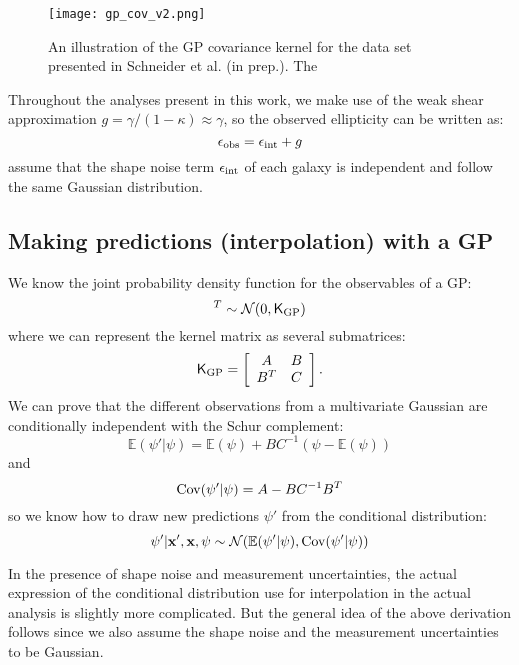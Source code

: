 \begin{figure}
	\centering
	\texttt{[image: gp\_cov\_v2.png]}
	\caption{An illustration of the GP covariance kernel for the data set
		presented in Schneider et al. (in prep.). The  
		\label{fig:GP_kernel_vis}}
\end{figure}




Throughout the analyses present in this work, 
we make use of the weak shear approximation 
$g = \gamma / (1 - \kappa)  \approx \gamma$, so the observed ellipticity can be
written as: 
\begin{equation}
	\epsilon_{\rm obs} = \epsilon_{\rm int} + g 
\end{equation}
assume that the shape noise term $\epsilon_{\rm int}$ of each galaxy is 
independent and follow the same Gaussian distribution.  

\subsection{Making predictions (interpolation) with a GP}
We know the joint probability density function for the observables of a GP:
\begin{equation}
	[\psi',\psi]^T \sim \mathcal{N}(0, \kerngp_{\rm GP})
\end{equation}
where we can represent the kernel matrix as several submatrices:
\begin{equation}
	\mathsf{K}_{\rm GP} = \left[\begin{array}{cc}
	A & B \\
	B^T & C 
\end{array} \right].	
\end{equation}
We can prove that the different observations from a multivariate Gaussian are 
conditionally independent with the Schur complement:
\begin{equation}
	\mathbb{E}(\psi'|\psi) = \mathbb{E}(\psi) + BC^{-1}(\psi - \mathbb{E}(\psi))
\end{equation}
and
\begin{equation}
	\mathrm{Cov}(\psi'|\psi) = A - BC^{-1}B^T
\end{equation}
so we know how to draw new predictions $\psi'$ from the conditional distribution:
\begin{equation} 
	\psi' | \mathbf{x}', \mathbf{x}, \psi \sim \mathcal{N}(
		\mathbb{E}(\psi'| \psi), \mathrm{Cov}(\psi'|\psi)
	)
\end{equation}

In the presence of shape noise and measurement uncertainties, the actual 
expression of the conditional distribution use for interpolation in the actual analysis 
is slightly more complicated. But the general idea of the above derivation follows 
since we also assume 
the shape noise and the measurement uncertainties to be Gaussian.


